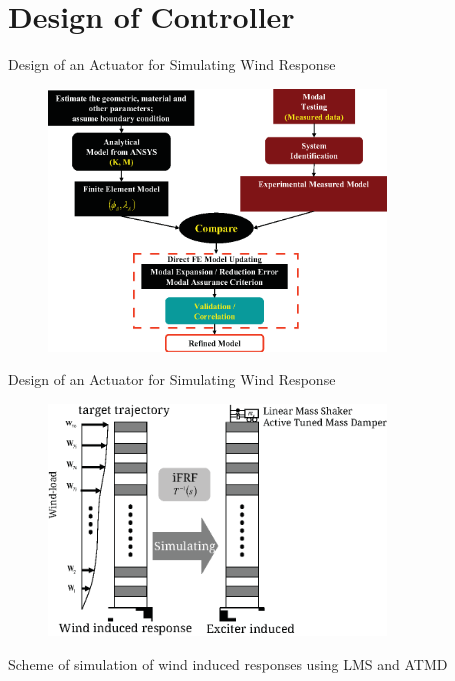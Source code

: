 \documentclass[usepdftitle=false]{beamer}
\begin{document}
\section{Design of Controller}

\begin{frame}{Design of an Actuator for Simulating Wind Response}
\begin{figure}[!ht]
\centering
\includegraphics[width=0.8\textwidth] {figure/si.eps}
\end{figure}
\end{frame}

\begin{frame}{Design of an Actuator for Simulating Wind Response}
\begin{figure}[ht]
\centering
\includegraphics[width=0.8\textwidth] {figure/6-1.eps}
\label{fig:6-1}
\end{figure}
Scheme of simulation of wind induced responses using LMS and ATMD
\end{frame}
\end{document}
